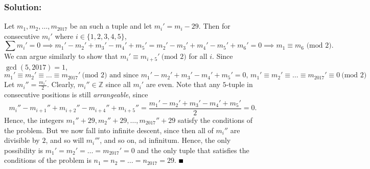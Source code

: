 \documentclass[fontsize=10pt]{article}
\begin{document}
\subsubsection*{Solution:}
Let $m_1, m_2, \dots , m_{2017}$ be an such a tuple and let 
$m_i' = m_i-29$. Then for consecutive $m_i'$ where $i \in \{1,2,3,4,5 \}$, \[ \sum m_i' = 0  
\implies m_1'-m_2'+m_3'-m_4'+m_5'=m_2'-m_3'+m_4'-m_5'+m_6'=0 \implies m_1 \equiv m_6 \text{ (mod 2).}\]
We can argue similarly to show that $m_i' \equiv m_{i+5}' \ \text{(mod 2)}$ for all $i$. Since $\gcd(5, 2017) = 1$, 
\[m_1' \equiv m_2' \equiv \dots \equiv m_{2017}' \ \text{(mod 2) and since $m_1'-m_2'+m_3'-m_4'+m_5' = 0$, } 
m_1' \equiv m_2' \equiv \dots \equiv m_{2017}' \equiv 0 \ \text{(mod 2)} \]
Let $m_i'' = \frac{m_i'}{2}$. Clearly, $m_i'' \in \mathbb{Z}$ since all $m_i'$ are even. 
Note that any $5$-tuple in consecutive positions is still \emph{arrangeable}, since 
\[m_i''-m_{i+1}''+m_{i+2}''-m_{i+4}''+m_{i+5}'' = \frac{m_1'-m_2'+m_3'-m_4'+m_5'}{2}  = 0.\]
Hence, the integers $m_1''+29, m_2''+29, \dots , m_{2017}''+29$ satisfy the conditions of the problem.
But we now fall into infinite descent, since then all of $m_i''$ are divisible by $2$, and so will $m_i'''$,
and so on, ad infinitum. Hence, the only possibility is $m_1' = m_2' = \dots = m_{2017}' = 0$
and the only tuple that satisfies the conditions of the problem is $n_1 = n_2 = \dots = n_{2017} = 29.$ $\hfill \blacksquare$
\end{document}
